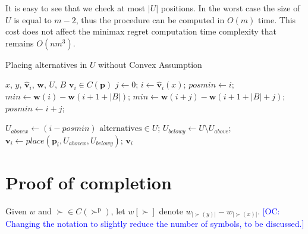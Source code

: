 \documentclass[12pt]{article}
\newcommand{\commentOC}[1]{\textcolor{blue}{\small$\big[$OC: #1$\big]$}}
\newcommand{\pref}{\succ}%
\newcommand{\ppref}{\succ^\text{p}}%
\newcommand{\profile}{\textbf{v}}%
\newcommand{\pprofile}{\textbf{p}}%
\newcommand{\w}{\textbf{w}}%
\begin{document}
It is easy to see that we check at most $|U|$ positions. In the worst case the size of $U$ is equal to $m-2$, thus the procedure can be computed in $O(m)$ time. This cost does not affect the minimax regret computation time complexity that remains $O(nm^3)$.

\begin{algorithm}[h] 
	\caption{Placing alternatives in $U$ without Convex Assumption}
	\label{alg:splittingU} 
	\begin{algorithmic}
		\Require $x$, $y$, $\hat{\profile}_i$, $\w$, $U$, $B$
		\Ensure $\profile_i \in C(\pprofile)$
		\Statex
		\State $ j \gets 0$;
		\State $ i \gets \hat{\profile}_i(x)$;
		\State $ \mathit{posmin} \gets i$;
		\State $ \mathit{min} \gets \w(i) - \w(i+1+|B|)$;
		\If{ $(\w(i+j)-\w(i+1+|B|+j) < \mathit{min})$ }
		\State $ \mathit{min} \gets \w(i+j) - \w(i+1+|B|+j)$;
		\State $ \mathit{posmin} \gets i+j$;
		\EndIf
		\EndWhile
		
		\State $U_{\mathit{abovex}} \gets (i-\mathit{posmin}) \text{ alternatives} \in U $;
		\State $U_{\mathit{belowy}} \gets U \setminus U_{\mathit{above}}$;
		\Statex
		\State $\profile_i \gets place(\pprofile_i,U_{\mathit{abovex}},U_{\mathit{belowy}})$;
		\Statex \Return $\profile_i$
		
	\end{algorithmic}
\end{algorithm}

% 
% 
% 
%
%
%

\section{Proof of completion}
\label{sec:prfCompl}
Given $w$ and ${\pref} \in C(\ppref)$, let $w[\pref]$ denote $w_{|\pref(y)|} - w_{|\pref(x)|}$. \commentOC{Changing the notation to slightly reduce the number of symbols, to be discussed.}
\end{document}
